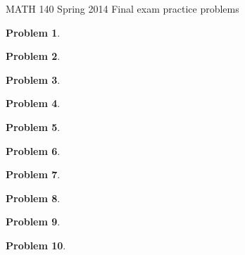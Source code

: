 \documentclass{article}[12pt]
\newtheorem{problem}{Problem}
\begin{document}
\begin{center}
MATH 140 Spring 2014 Final exam practice problems 
\end{center}


\begin{problem}

\end{problem}

\begin{problem}

\end{problem}

\begin{problem}

\end{problem}

\begin{problem}

\end{problem}

\begin{problem}


\end{problem}

\begin{problem}

\end{problem}

\begin{problem}

\end{problem}

\begin{problem}

\end{problem}

\begin{problem}

\end{problem}

\begin{problem}

\end{problem}

\end{document}
